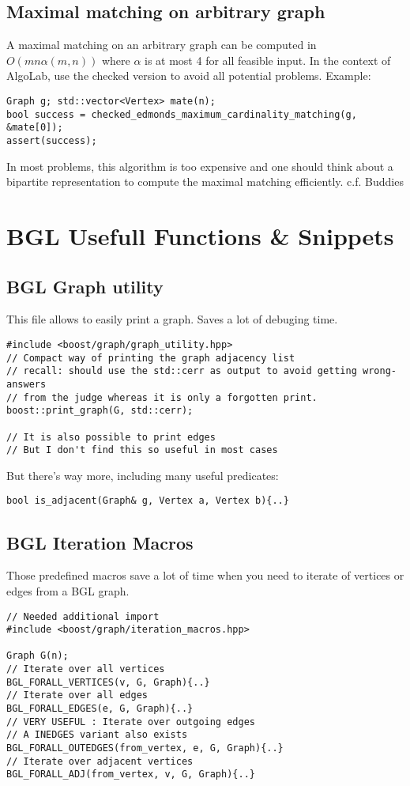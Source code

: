 \documentclass{article}
\begin{document}
\subsection{Maximal matching on arbitrary graph}
A maximal matching on an arbitrary graph can be computed in  $O(mn \alpha(m,n))$ where $\alpha$ is at most 4 for all feasible input. In the context of AlgoLab, use the checked version to avoid all potential problems. Example: 
\begin{lstlisting}[frame=single]
Graph g; std::vector<Vertex> mate(n);
bool success = checked_edmonds_maximum_cardinality_matching(g, &mate[0]);
assert(success);
\end{lstlisting}
In most problems, this algorithm is too expensive and one should think about a bipartite representation to compute the maximal matching efficiently.
c.f. Buddies
\section{BGL Usefull Functions \& Snippets}
\subsection{BGL Graph utility}
This file allows to easily print a graph. Saves a lot of debuging time.
\begin{lstlisting}[frame=single]
#include <boost/graph/graph_utility.hpp>
// Compact way of printing the graph adjacency list
// recall: should use the std::cerr as output to avoid getting wrong-answers
// from the judge whereas it is only a forgotten print.
boost::print_graph(G, std::cerr);

// It is also possible to print edges
// But I don't find this so useful in most cases
\end{lstlisting}

But there's way more, including many useful predicates:
\begin{lstlisting}[frame=single]
bool is_adjacent(Graph& g, Vertex a, Vertex b){..}
\end{lstlisting}


\subsection{BGL Iteration Macros}
Those predefined macros save a lot of time when you need to iterate of vertices or edges from a BGL graph.
\begin{lstlisting}[frame=single]
// Needed additional import
#include <boost/graph/iteration_macros.hpp>

Graph G(n);
// Iterate over all vertices
BGL_FORALL_VERTICES(v, G, Graph){..}
// Iterate over all edges
BGL_FORALL_EDGES(e, G, Graph){..}
// VERY USEFUL : Iterate over outgoing edges
// A INEDGES variant also exists
BGL_FORALL_OUTEDGES(from_vertex, e, G, Graph){..}
// Iterate over adjacent vertices
BGL_FORALL_ADJ(from_vertex, v, G, Graph){..}
\end{lstlisting}
\end{document}

